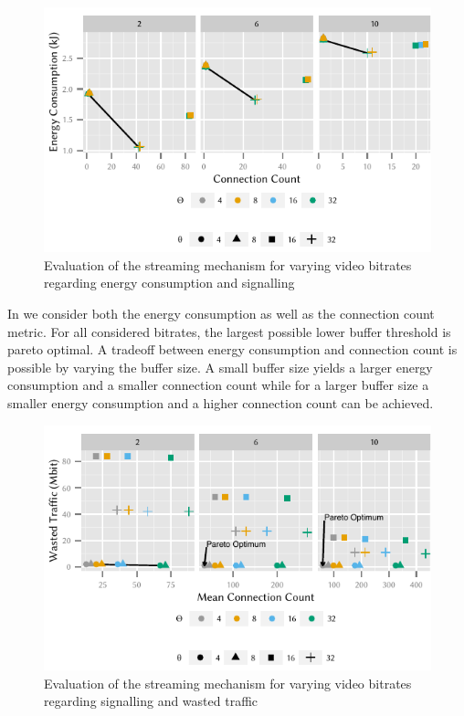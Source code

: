 \begin{figure}
  \centering
  \includegraphics{application/lte_video/trade_offs/figures/energy2connections}
  \caption{Evaluation of the streaming mechanism for varying video bitrates regarding energy consumption and signalling}
  \label{fig:application:lte_video:numerical_evaluation:trade_offs:energy2connections}
\end{figure}

In  we consider both the energy consumption as well as the connection count metric.
For all considered bitrates, the largest possible lower buffer threshold is pareto optimal.
A tradeoff between energy consumption and connection count is possible by varying the buffer size.
A small buffer size yields a larger energy consumption and a smaller connection count while for a larger buffer size a smaller energy consumption and a higher connection count can be achieved.

\begin{figure}
  \centering
  \includegraphics{application/lte_video/trade_offs/figures/connections2lostData}
  \caption{Evaluation of the streaming mechanism for varying video bitrates regarding signalling and wasted traffic}
  \label{fig:application:lte_video:numerical_evaluation:trade_offs:connections2lostData}
\end{figure}

